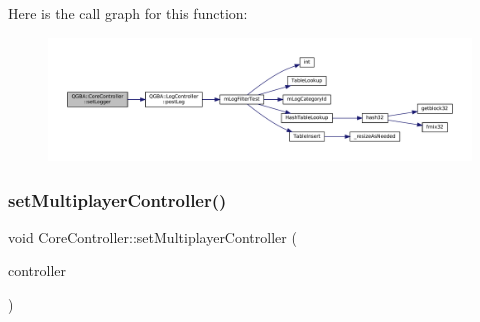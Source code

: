 Here is the call graph for this function\+:
\nopagebreak
\begin{figure}[H]
\begin{center}
\leavevmode
\includegraphics[width=350pt]{class_q_g_b_a_1_1_core_controller_aabf966793a76ac2c77cb4f89def2c08f_cgraph}
\end{center}
\end{figure}
\mbox{\label{class_q_g_b_a_1_1_core_controller_a222d740640682346f2ee8725641727ee}} 
\subsubsection{\texorpdfstring{set\+Multiplayer\+Controller()}{setMultiplayerController()}}
{\footnotesize\ttfamily void Core\+Controller\+::set\+Multiplayer\+Controller (\begin{DoxyParamCaption}\item[{\mbox{\hyperlink{class_q_g_b_a_1_1_multiplayer_controller}{Multiplayer\+Controller}} $\ast$}]{controller }\end{DoxyParamCaption})}

